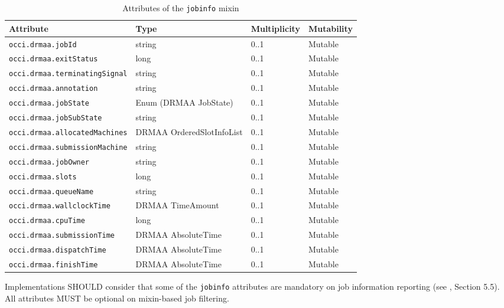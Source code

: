 \documentclass[10pt]{article}
\newcommand{\h}[1]{\lstinline|#1|}
\begin{document}
\begin{table}[ht]
\centering
\begin{tabularx}{\textwidth}{|l|X|l|l|}
\hline 
Attribute           & Type                         & Multiplicity & Mutability \\
\hline
\h{occi.drmaa.jobId}               & string                       & 0..1 & Mutable   \\ 
\h{occi.drmaa.exitStatus}          & long                         & 0..1 & Mutable   \\
\h{occi.drmaa.terminatingSignal}   & string                       & 0..1 & Mutable   \\
\h{occi.drmaa.annotation}          & string                       & 0..1 & Mutable   \\
\h{occi.drmaa.jobState}            & Enum (DRMAA JobState)        & 0..1 & Mutable   \\
\h{occi.drmaa.jobSubState}         & string                       & 0..1 & Mutable   \\
\h{occi.drmaa.allocatedMachines}   & DRMAA OrderedSlotInfoList    & 0..1 & Mutable   \\
\h{occi.drmaa.submissionMachine}   & string                       & 0..1 & Mutable   \\
\h{occi.drmaa.jobOwner}            & string                       & 0..1 & Mutable   \\
\h{occi.drmaa.slots}               & long                         & 0..1 & Mutable   \\
\h{occi.drmaa.queueName}           & string                       & 0..1 & Mutable   \\
\h{occi.drmaa.wallclockTime}       & DRMAA TimeAmount             & 0..1 & Mutable   \\
\h{occi.drmaa.cpuTime}             & long                         & 0..1 & Mutable   \\
\h{occi.drmaa.submissionTime}      & DRMAA AbsoluteTime           & 0..1 & Mutable   \\
\h{occi.drmaa.dispatchTime}        & DRMAA AbsoluteTime           & 0..1 & Mutable   \\
\h{occi.drmaa.finishTime}          & DRMAA AbsoluteTime           & 0..1 & Mutable   \\
\hline
\end{tabularx}
\caption{Attributes of the \h{jobinfo} mixin}
\label{tab:jobinfoattributes}
\end{table}

Implementations SHOULD consider that some of the \h{jobinfo} attributes are mandatory on job information reporting (see \cite{gfd193}, Section 5.5). All attributes MUST be optional on mixin-based job filtering.
\end{document}
